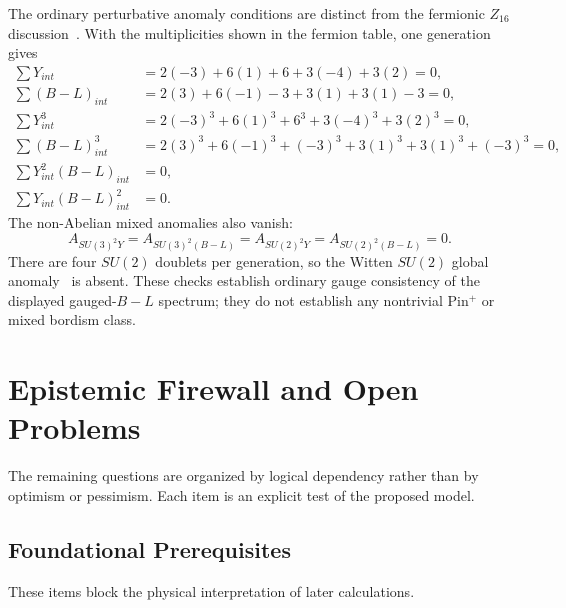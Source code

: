\documentclass[11pt]{article}
\theoremstyle{canonmath}
\theoremstyle{canonpostulate}
\theoremstyle{canonclaim}
\def\mathrm#1{#1}%
\def\mathbb#1{#1}%
\def\mathcal#1{#1}%
\begin{document}
The ordinary perturbative anomaly conditions are distinct from the fermionic $\mathbb Z_{16}$ discussion~\cite{Davighi}. With the multiplicities shown in the fermion table, one generation gives
\begin{align}
\sum Y_{\mathrm{int}}&=2(-3)+6(1)+6+3(-4)+3(2)=0,\\
\sum (B-L)_{\mathrm{int}}&=2(3)+6(-1)-3+3(1)+3(1)-3=0,\\
\sum Y_{\mathrm{int}}^3&=2(-3)^3+6(1)^3+6^3+3(-4)^3+3(2)^3=0,\\
\sum (B-L)_{\mathrm{int}}^3&=2(3)^3+6(-1)^3+(-3)^3+3(1)^3+3(1)^3+(-3)^3=0,\\
\sum Y_{\mathrm{int}}^2(B-L)_{\mathrm{int}}&=0,\\
\sum Y_{\mathrm{int}}(B-L)_{\mathrm{int}}^2&=0.
\end{align}
The non-Abelian mixed anomalies also vanish:
\begin{equation}
\mathcal A_{SU(3)^2Y}=\mathcal A_{SU(3)^2(B-L)}
=\mathcal A_{SU(2)^2Y}=\mathcal A_{SU(2)^2(B-L)}=0.
\end{equation}
There are four $SU(2)$ doublets per generation, so the Witten $SU(2)$ global anomaly~\cite{WittenSU2} is absent. These checks establish ordinary gauge consistency of the displayed gauged-$B-L$ spectrum; they do not establish any nontrivial Pin$^+$ or mixed bordism class.

\section{Epistemic Firewall and Open Problems}
\label{sec:firewall}

The remaining questions are organized by logical dependency rather than by optimism or pessimism. Each item is an explicit test of the proposed model.

\subsection*{Foundational Prerequisites}
These items block the physical interpretation of later calculations.
\end{document}
